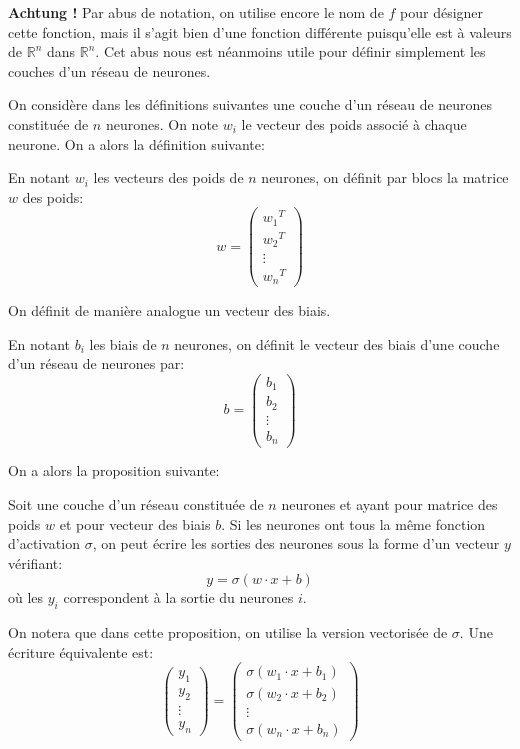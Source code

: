 \textbf{Achtung !} Par abus de notation, on utilise encore le nom de $f$ pour désigner 
cette fonction, mais il s'agit bien d'une fonction différente puisqu'elle est à valeurs 
de $\mathbb{R}^n$ dans $\mathbb{R}^n$. Cet abus nous est néanmoins utile pour définir 
simplement les couches d'un réseau de neurones.

On considère dans les définitions suivantes une couche d'un réseau de neurones 
constituée de $n$ neurones. On note $w_i$ le vecteur des poids associé à chaque neurone.
On a alors la définition suivante:
 
\begin{definition}
En notant $w_i$ les vecteurs des poids de $n$ neurones, on définit par blocs 
la matrice $w$ des poids:
\[
w = 
\begin{pmatrix}
{w_1}^T \\
{w_2}^T \\
\vdots \\
{w_n}^T
\end{pmatrix}
\]
\end{definition}

On définit de manière analogue un vecteur des biais.

\begin{definition}
En notant $b_i$ les biais de $n$ neurones, on définit le vecteur des biais 
d'une couche d'un réseau de neurones par:
\[
b = 
\begin{pmatrix}
{b_1} \\
{b_2} \\
\vdots \\
{b_n}
\end{pmatrix}
\]
\end{definition}

On a alors la proposition suivante:

\begin{proposition}
Soit une couche d'un réseau constituée de $n$ neurones et ayant pour matrice 
des poids $w$ et pour vecteur des biais $b$. Si les neurones ont tous la même 
fonction d'activation $\sigma$, on peut écrire les sorties des neurones sous la 
forme d'un vecteur $y$ vérifiant:
\[
y = \sigma(w \cdot x + b)
\]
où les $y_i$ correspondent à la sortie du neurones $i$.
\end{proposition}

On notera que dans cette proposition, on utilise la version vectorisée de $\sigma$.
Une écriture équivalente est:
\[
\begin{pmatrix}
  y_1 \\
  y_2 \\
  \vdots \\
  y_n
\end{pmatrix}
 = 
\begin{pmatrix}
  \sigma(w_1 \cdot x + b_1) \\
  \sigma(w_2 \cdot x + b_2) \\
  \vdots \\
  \sigma(w_n \cdot x + b_n)
\end{pmatrix}
\]

